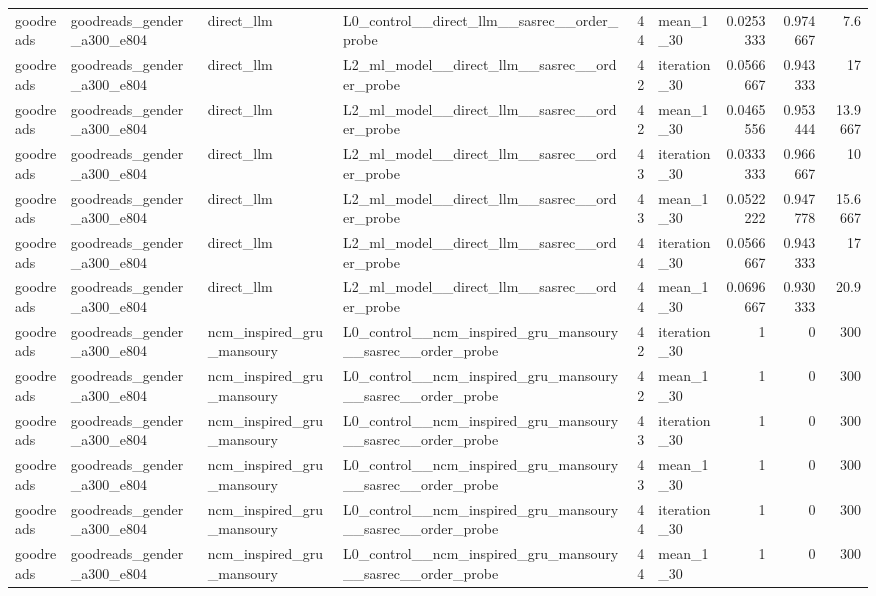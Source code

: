 \begin{table}[htbp!]
\begin{tabular}{llllrlrrr}
goodreads & goodreads\_gender\_a300\_e804 & direct\_llm & L0\_control\_\_direct\_llm\_\_sasrec\_\_order\_probe & 44 & mean\_1\_30 & 0.0253333 & 0.974667 & 7.6 \\
goodreads & goodreads\_gender\_a300\_e804 & direct\_llm & L2\_ml\_model\_\_direct\_llm\_\_sasrec\_\_order\_probe & 42 & iteration\_30 & 0.0566667 & 0.943333 & 17 \\
goodreads & goodreads\_gender\_a300\_e804 & direct\_llm & L2\_ml\_model\_\_direct\_llm\_\_sasrec\_\_order\_probe & 42 & mean\_1\_30 & 0.0465556 & 0.953444 & 13.9667 \\
goodreads & goodreads\_gender\_a300\_e804 & direct\_llm & L2\_ml\_model\_\_direct\_llm\_\_sasrec\_\_order\_probe & 43 & iteration\_30 & 0.0333333 & 0.966667 & 10 \\
goodreads & goodreads\_gender\_a300\_e804 & direct\_llm & L2\_ml\_model\_\_direct\_llm\_\_sasrec\_\_order\_probe & 43 & mean\_1\_30 & 0.0522222 & 0.947778 & 15.6667 \\
goodreads & goodreads\_gender\_a300\_e804 & direct\_llm & L2\_ml\_model\_\_direct\_llm\_\_sasrec\_\_order\_probe & 44 & iteration\_30 & 0.0566667 & 0.943333 & 17 \\
goodreads & goodreads\_gender\_a300\_e804 & direct\_llm & L2\_ml\_model\_\_direct\_llm\_\_sasrec\_\_order\_probe & 44 & mean\_1\_30 & 0.0696667 & 0.930333 & 20.9 \\
goodreads & goodreads\_gender\_a300\_e804 & ncm\_inspired\_gru\_mansoury & L0\_control\_\_ncm\_inspired\_gru\_mansoury\_\_sasrec\_\_order\_probe & 42 & iteration\_30 & 1 & 0 & 300 \\
goodreads & goodreads\_gender\_a300\_e804 & ncm\_inspired\_gru\_mansoury & L0\_control\_\_ncm\_inspired\_gru\_mansoury\_\_sasrec\_\_order\_probe & 42 & mean\_1\_30 & 1 & 0 & 300 \\
goodreads & goodreads\_gender\_a300\_e804 & ncm\_inspired\_gru\_mansoury & L0\_control\_\_ncm\_inspired\_gru\_mansoury\_\_sasrec\_\_order\_probe & 43 & iteration\_30 & 1 & 0 & 300 \\
goodreads & goodreads\_gender\_a300\_e804 & ncm\_inspired\_gru\_mansoury & L0\_control\_\_ncm\_inspired\_gru\_mansoury\_\_sasrec\_\_order\_probe & 43 & mean\_1\_30 & 1 & 0 & 300 \\
goodreads & goodreads\_gender\_a300\_e804 & ncm\_inspired\_gru\_mansoury & L0\_control\_\_ncm\_inspired\_gru\_mansoury\_\_sasrec\_\_order\_probe & 44 & iteration\_30 & 1 & 0 & 300 \\
goodreads & goodreads\_gender\_a300\_e804 & ncm\_inspired\_gru\_mansoury & L0\_control\_\_ncm\_inspired\_gru\_mansoury\_\_sasrec\_\_order\_probe & 44 & mean\_1\_30 & 1 & 0 & 300 \\

\end{tabular}
\end{table}
